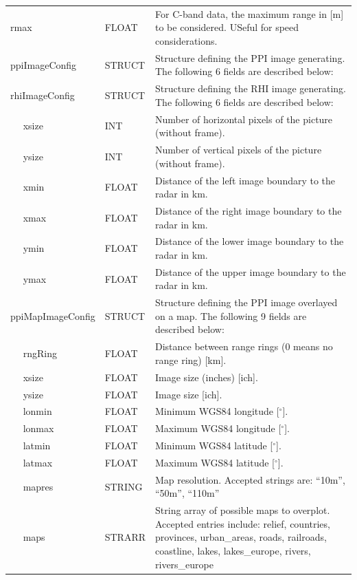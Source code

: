 \documentclass[a4paper,11pt,pdftex,twoside]{scrartcl}
\begin{document}
{{{\begin{longtable}{p{}p{}p{}}
rmax            & FLOAT & For C-band data, the maximum range in [m] to be considered. USeful for speed
                                 considerations.   \\
ppiImageConfig     & STRUCT    & Structure defining the PPI image generating. The following 6
                                 fields are described below:\\
rhiImageConfig     & STRUCT    & Structure defining the RHI image generating. The following 6
                                 fields are described below:\\
$\quad$ xsize      & INT       & Number of horizontal pixels of the picture (without frame).\\
$\quad$ ysize      & INT       & Number of vertical pixels of the picture (without frame).\\
$\quad$ xmin       & FLOAT     & Distance of the left image boundary to the radar in km.\\
$\quad$ xmax       & FLOAT     & Distance of the right image boundary to the radar in km.\\
$\quad$ ymin       & FLOAT     & Distance of the lower image boundary to the radar in km.\\
$\quad$ ymax       & FLOAT     & Distance of the upper image boundary to the radar in km.\\

ppiMapImageConfig     & STRUCT & Structure defining the PPI image overlayed on a map. The following 9 fields are described below:\\
$\quad$ rngRing  & FLOAT      & Distance between range rings (0 means no range ring) [km].\\
$\quad$ xsize    & FLOAT      & Image size (inches) [ich].\\
$\quad$ ysize    & FLOAT      & Image size [ich].\\
$\quad$ lonmin   & FLOAT      & Minimum WGS84 longitude [$^\circ$].\\
$\quad$ lonmax   & FLOAT      & Maximum WGS84 longitude [$^\circ$].\\
$\quad$ latmin   & FLOAT      & Minimum WGS84 latitude [$^\circ$].\\
$\quad$ latmax   & FLOAT      & Maximum WGS84 latitude [$^\circ$].\\
$\quad$ mapres   & STRING     & Map resolution. Accepted strings are: ``10m'', ``50m'', ``110m'' \\
$\quad$ maps     & STRARR     & String array of possible maps to overplot. Accepted entries include: 
                                relief, countries, provinces, urban\_areas, roads, railroads, 
                                coastline, lakes, lakes\_europe, rivers, rivers\_europe   \\




\end{longtable}}}}
\end{document}
